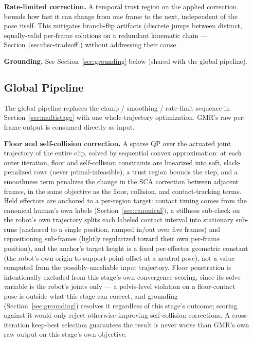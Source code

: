 \noindent\textbf{Rate-limited correction.} A temporal trust region on the
applied correction bounds how fast it can change from one frame to the
next, independent of the pose itself. This mitigates branch-flip artifacts
(discrete jumps between distinct, equally-valid per-frame solutions on a
redundant kinematic chain --- Section~\ref{sec:disc-tradeoff}) without
addressing their cause.

\noindent\textbf{Grounding.} See Section~\ref{sec:grounding} below (shared
with the global pipeline).

\subsection{Global Pipeline}
\label{sec:global}

The global pipeline replaces the clamp / smoothing / rate-limit sequence in
Section~\ref{sec:multistage} with one whole-trajectory optimization. GMR's
raw per-frame output is consumed directly as input.

\noindent\textbf{Floor and self-collision correction.} A sparse QP over the
actuated joint trajectory of the entire clip, solved by sequential convex
approximation: at each outer iteration, floor and self-collision
constraints are linearized into soft, slack-penalized rows (never
primal-infeasible), a trust region bounds the step, and a smoothness term
penalizes the change in the SCA correction between adjacent frames, in the
same objective as the floor, collision, and contact-tracking terms. Held
effectors are anchored to a per-region target: contact timing comes from
the canonical human's own labels (Section~\ref{sec:canonical}), a stillness
sub-check on the robot's own trajectory splits each labeled contact
interval into stationary sub-runs (anchored to a single position, ramped
in/out over five frames) and repositioning sub-frames (lightly regularized
toward their own per-frame position), and the anchor's target height is a
fixed per-effector geometric constant (the robot's own origin-to-support-point
offset at a neutral pose), not a value computed from the possibly-unreliable
input trajectory. Floor penetration is intentionally excluded from this
stage's own convergence scoring, since its solve variable is the robot's
joints only --- a pelvis-level violation on a floor-contact pose is outside
what this stage can correct, and grounding (Section~\ref{sec:grounding})
resolves it regardless of this stage's outcome; scoring against it would
only reject otherwise-improving self-collision corrections. A
cross-iteration keep-best selection guarantees the result is never worse
than GMR's own raw output on this stage's own objective.

